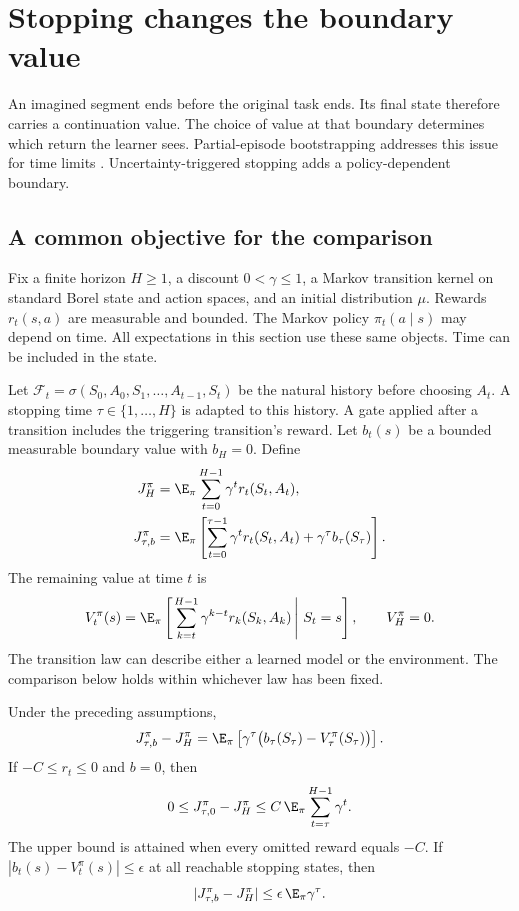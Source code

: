 \section{Stopping changes the boundary value}
\label{sec:stopping}

An imagined segment ends before the original task ends. Its final state therefore carries a continuation value. The choice of value at that boundary determines which return the learner sees. Partial-episode bootstrapping addresses this issue for time limits \cite{pardo}. Uncertainty-triggered stopping adds a policy-dependent boundary.

\subsection{A common objective for the comparison}

Fix a finite horizon $H\ge1$, a discount $0<\gamma\le1$, a Markov transition kernel on standard Borel state and action spaces, and an initial distribution $\mu$. Rewards $r_t(s,a)$ are measurable and bounded. The Markov policy $\pi_t(a\mid s)$ may depend on time. All expectations in this section use these same objects. Time can be included in the state.

Let $\mathcal F_t=\sigma(S_0,A_0,S_1,\ldots,A_{t-1},S_t)$ be the natural history before choosing $A_t$. A stopping time $\tau\in\{1,\ldots,H\}$ is adapted to this history. A gate applied after a transition includes the triggering transition's reward. Let $b_t(s)$ be a bounded measurable boundary value with $b_H=0$. Define
\begin{align}
J_H^\pi&=\E_\pi\sum_{t=0}^{H-1}\gamma^t r_t(S_t,A_t),\\
J_{\tau,b}^\pi&=\E_\pi\left[\sum_{t=0}^{\tau-1}\gamma^t r_t(S_t,A_t)+\gamma^\tau b_\tau(S_\tau)\right].
\end{align}
The remaining value at time $t$ is
\begin{equation}
V_t^\pi(s)=\E_\pi\left[\left.\sum_{k=t}^{H-1}\gamma^{k-t}r_k(S_k,A_k)\,\right|\,S_t=s\right],\qquad V_H^\pi=0.
\end{equation}
The transition law can describe either a learned model or the environment. The comparison below holds within whichever law has been fixed.

\begin{proposition}
\label{prop:boundary}
Under the preceding assumptions,
\begin{equation}
J_{\tau,b}^\pi-J_H^\pi
=\E_\pi\left[\gamma^\tau\bigl(b_\tau(S_\tau)-V_\tau^\pi(S_\tau)\bigr)\right].
\label{eq:boundary-error}
\end{equation}
If $-C\le r_t\le0$ and $b=0$, then
\begin{equation}
0\le J_{\tau,0}^\pi-J_H^\pi
\le C\,\E_\pi\sum_{t=\tau}^{H-1}\gamma^t.
\label{eq:boundary-bound}
\end{equation}
The upper bound is attained when every omitted reward equals $-C$. If $|b_t(s)-V_t^\pi(s)|\le\epsilon$ at all reachable stopping states, then
\begin{equation}
|J_{\tau,b}^\pi-J_H^\pi|\le\epsilon\,\E_\pi\gamma^\tau.
\end{equation}
\end{proposition}


